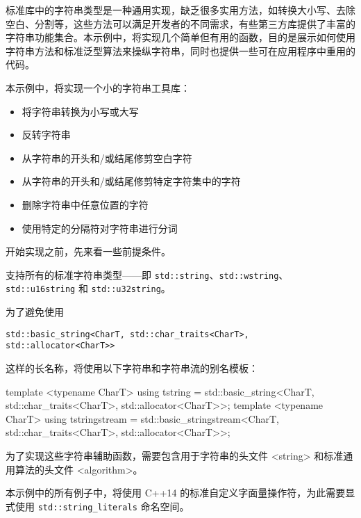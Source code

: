 
标准库中的字符串类型是一种通用实现，缺乏很多实用方法，如转换大小写、去除空白、分割等，这些方法可以满足开发者的不同需求，有些第三方库提供了丰富的字符串功能集合。本示例中，将实现几个简单但有用的函数，目的是展示如何使用字符串方法和标准泛型算法来操纵字符串，同时也提供一些可在应用程序中重用的代码。

本示例中，将实现一个小的字符串工具库：

\begin{itemize}
\item
将字符串转换为小写或大写

\item
反转字符串

\item
从字符串的开头和/或结尾修剪空白字符

\item
从字符串的开头和/或结尾修剪特定字符集中的字符

\item
删除字符串中任意位置的字符

\item
使用特定的分隔符对字符串进行分词
\end{itemize}

开始实现之前，先来看一些前提条件。


支持所有的标准字符串类型——即 \verb|std::string|、\verb|std::wstring|、\verb|std::u16string| 和 \verb|std::u32string|。

为了避免使用

\verb|std::basic_string<CharT, std::char_traits<CharT>, std::allocator<CharT>>|

这样的长名称，将使用以下字符串和字符串流的别名模板：

\begin{cpp}
template <typename CharT>
using tstring =
    std::basic_string<CharT, std::char_traits<CharT>,
                      std::allocator<CharT>>;
template <typename CharT>
using tstringstream =
    std::basic_stringstream<CharT, std::char_traits<CharT>,
                            std::allocator<CharT>>;
\end{cpp}

为了实现这些字符串辅助函数，需要包含用于字符串的头文件 <string> 和标准通用算法的头文件 <algorithm>。

本示例中的所有例子中，将使用 C++14 的标准自定义字面量操作符，为此需要显式使用 \verb|std::string_literals| 命名空间。


